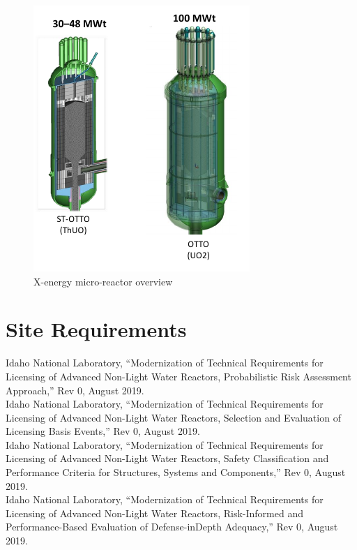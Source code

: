 \documentclass[10pt,a4paper]{article}
\begin{document}
\begin{figure}[hbtp]
\centering
\includegraphics[scale=1]{Figs/fig5.jpeg}
\caption{X-energy micro-reactor overview}
\label{xo}
\end{figure}

\section{Site Requirements}
Idaho National Laboratory, “Modernization of Technical Requirements for Licensing of Advanced Non-Light Water Reactors, Probabilistic Risk Assessment Approach,” Rev 0, August 2019.\\ 
Idaho National Laboratory, “Modernization of Technical Requirements for Licensing of Advanced Non-Light Water Reactors, Selection and Evaluation of Licensing Basis Events,” Rev 0, August 2019.\\ 
Idaho National Laboratory, “Modernization of Technical Requirements for Licensing of Advanced Non-Light Water Reactors, Safety Classification and Performance Criteria for Structures, Systems and Components,” Rev 0, August 2019.\\ 
Idaho National Laboratory, “Modernization of Technical Requirements for Licensing of Advanced Non-Light Water Reactors, Risk-Informed and Performance-Based Evaluation of Defense-inDepth Adequacy,” Rev 0, August 2019.
\end{document}
